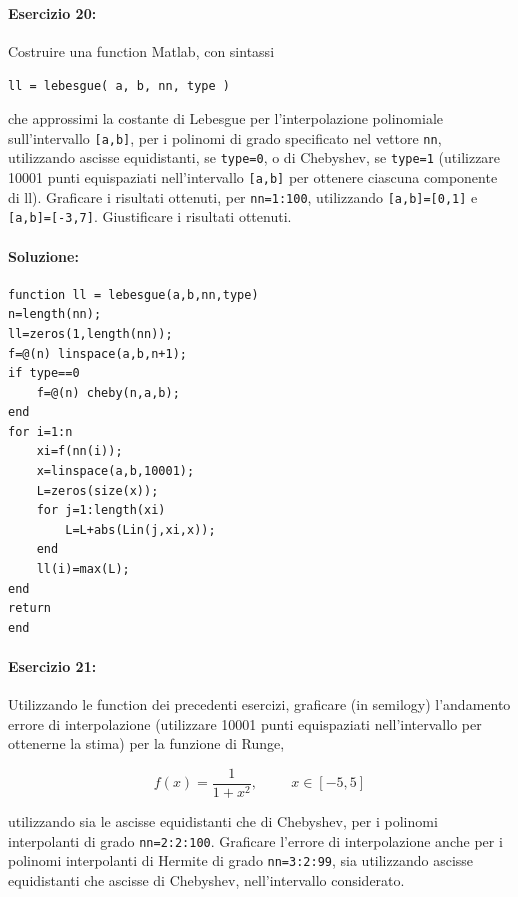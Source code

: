 \documentclass[12pt]{article}
\begin{document}
\paragraph{Esercizio 20:}
Costruire una function Matlab, con sintassi
\begin{center}
    \texttt{ll = lebesgue( a, b, nn, type )}
\end{center}
che approssimi la costante di Lebesgue per l'interpolazione polinomiale sull'intervallo \texttt{[a,b]}, per
i polinomi di grado specificato nel vettore \texttt{nn}, utilizzando ascisse equidistanti, se \texttt{type=0}, o di
Chebyshev, se \texttt{type=1} (utilizzare 10001 punti equispaziati nell'intervallo \texttt{[a,b]} per ottenere ciascuna componente di ll). 
Graficare i risultati ottenuti, per \texttt{nn=1:100}, utilizzando \texttt{[a,b]=[0,1]} e \texttt{[a,b]=[-3,7]}. Giustificare i risultati ottenuti.

\paragraph{Soluzione:}

\begin{lstlisting}[frame=single]
function ll = lebesgue(a,b,nn,type)
n=length(nn);
ll=zeros(1,length(nn));
f=@(n) linspace(a,b,n+1);
if type==0
    f=@(n) cheby(n,a,b);
end
for i=1:n
    xi=f(nn(i));
    x=linspace(a,b,10001);
    L=zeros(size(x));
    for j=1:length(xi)
        L=L+abs(Lin(j,xi,x));
    end
    ll(i)=max(L);
end
return
end
\end{lstlisting}

\paragraph{Esercizio 21:}
Utilizzando le function dei precedenti esercizi, graficare (in semilogy) l'andamento
errore di interpolazione (utilizzare 10001 punti equispaziati nell'intervallo per ottenerne la stima)
per la funzione di Runge,

\begin{equation}
    f(x)=\frac{1}{1+x^{2}}, \hspace{1cm} x \in [-5,5]
\end{equation}

utilizzando sia le ascisse equidistanti che di Chebyshev, per i polinomi interpolanti di grado \texttt{nn=2:2:100}.
Graficare l'errore di interpolazione anche per i polinomi interpolanti di Hermite di grado \texttt{nn=3:2:99},
sia utilizzando ascisse equidistanti che ascisse di Chebyshev, nell'intervallo considerato.
\end{document}
